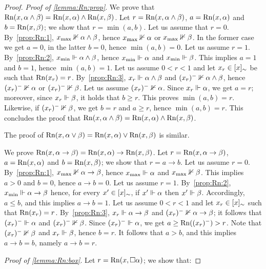 \begin{proof}
 \emph{Proof of \ref{lemma:Rn:prop}}.
  We prove that  $\mathrm{Rn}(x,\alpha\land \beta) =  \mathrm{Rn}(x,\alpha)\land  \mathrm{Rn}(x,\beta)$.
  Let $r=\mathrm{Rn}(x,\alpha\land \beta)$, $a=\mathrm{Rn}(x,\alpha)$ and
  $b=\mathrm{Rn}(x,\beta)$; we show that $r= \min(a,b)$.
  Let us assume that $r=0$.
By~\ref{prop:Rn:1},  $x_{\mathrm{max}} \nVdash \alpha\land \beta$, hence $x_{\mathrm{max}} \nVdash
  \alpha$ or $x_{\mathrm{max}}\nVdash \beta$.  In the former case we get $a=0$, in the
  latter $b=0$, hence  $\min(a,b)=0$.
  Let us assume $r=1$. By~\ref{prop:Rn:2},
  $x_{\mathrm{min}} \Vdash \alpha\land \beta$, hence $x_{\mathrm{min}} \Vdash \alpha$ and
  $x_{\mathrm{min}}\Vdash \beta$.  This implies $a=1$ and $b=1$, hence $\min(a,b)=1$.
  Let us assume $0 < r < 1$ and let  $x_r\in [x]_\sim$ be
  such that $\mathrm{Rn}(x_r) = r$.
By~\ref{prop:Rn:3},   $x_r\Vdash \alpha\land \beta$ and $(x_r)^-\nVdash \alpha\land
  \beta$, hence $(x_r)^- \nVdash \alpha$ or $(x_r)^-\nVdash \beta$.  
  Let us assume $(x_r)^- \nVdash \alpha$. Since $x_r\Vdash \alpha$, we get $a=r$;
  moreover, since $x_r\Vdash \beta$, it holds that  $b\geq r$.
  This proves $\min(a,b)=r$. Likewise, if $(x_r)^- \nVdash \beta$, we get
  $b=r$ and $a\geq r$, hence $\min(a,b)=r$.
  This concludes the proof that  $\mathrm{Rn}(x,\alpha\land \beta) =  \mathrm{Rn}(x,\alpha)\land  \mathrm{Rn}(x,\beta)$.
  
  
  The proof of  $\mathrm{Rn}(x,\alpha\lor \beta)= \mathrm{Rn}(x,\alpha)\lor \mathrm{Rn}(x,\beta)$ is similar.

We prove $\mathrm{Rn}(x,\alpha\to \beta) =\mathrm{Rn}(x,\alpha)\to \mathrm{Rn}(x,\beta)$.
Let $r=\mathrm{Rn}(x,\alpha\to \beta)$, $a=\mathrm{Rn}(x,\alpha)$ and $b=\mathrm{Rn}(x,\beta)$;
we show that $r = a\to b$.
  Let us assume $r=0$. By~\ref{prop:Rn:1},  $x_{\mathrm{max}} \nVdash \alpha\to \beta$,
  hence $x_{\mathrm{max}} \Vdash \alpha$ and $x_{\mathrm{max}} \nVdash \beta$.  This implies  $a> 0$ 
  and   $b=0$, hence $a\to b = 0$.  Let us assume $r=1$.
 By~\ref{prop:Rn:2},
  $x_{\mathrm{min}} \Vdash \alpha\to \beta$  hence, for every $x'\in[x]_\sim$, if $x'\Vdash
  \alpha$ then $x'\Vdash \beta$. Accordingly, $a \leq b$, and this implies
  $a\to b = 1 $.  Let us assume $0 < r < 1$ and let  $x_r\in [x]_\sim$ such that $\mathrm{Rn}(x_r)=r$.
   By~\ref{prop:Rn:3},  $x_r\Vdash \alpha\to \beta$
  and $(x_r)^-\nVdash \alpha\to \beta$; it follows that $(x_r)^-\Vdash
  \alpha$ and $(x_r)^-\nVdash \beta$.  Since $(x_r)^-\Vdash \alpha$, we get
  $a \geq \mathrm{Rn}((x_r)^-)>r$.  Note that
  $(x_r)^-\nVdash \beta$ and $x_r \Vdash \beta$, hence $b =r$.  It follows that $ a > b$, and this implies $a\to b
  = b $, namely $a\to b= r$.



\smallskip
\noindent
\emph{Proof of \ref{lemma:Rn:box}}.
Let $r=\mathrm{Rn}(x,\Box \alpha)$;   we show that:


\end{proof}
